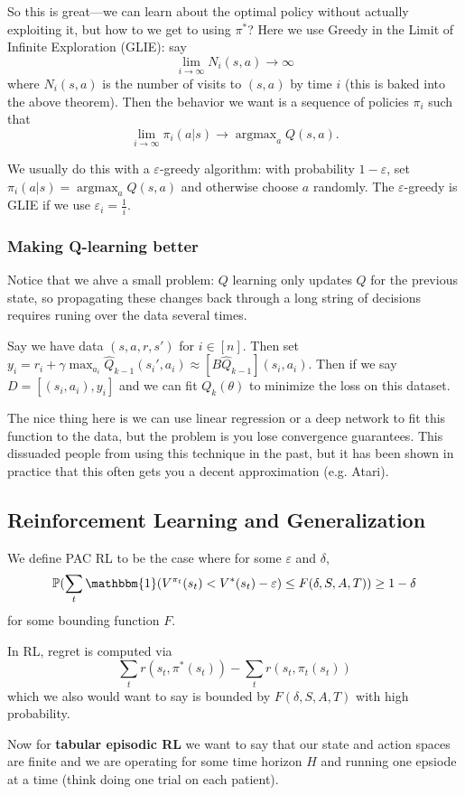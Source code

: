 \documentclass[12pt]{article}
\DeclareMathOperator*{\argmax}{argmax}
\begin{document}
So this is great---we can learn about the optimal policy without actually exploiting it, but how to we get to using $\pi^\ast$? Here we use Greedy in the Limit of Infinite Exploration (GLIE): say
\[\lim_{i\to\infty}N_i(s,a)\to\infty\]
where $N_i(s,a)$ is the number of visits to $(s,a)$ by time $i$ (this is baked into the above theorem). Then the behavior we want is a sequence of policies $\pi_i$ such that
\[\lim_{i\to\infty}\pi_i(a|s)\to\argmax_aQ(s,a).\]

We usually do this with a $\varepsilon$-greedy algorithm: with probability $1-\varepsilon$, set $\pi_i(a|s)=\argmax_aQ(s,a)$ and otherwise choose $a$ randomly. The $\varepsilon$-greedy is GLIE if we use $\varepsilon_i=\frac{1}{i}.$

\subsubsection{Making Q-learning better}
Notice that we ahve a small problem: $Q$ learning only updates $Q$ for the previous state, so propagating these changes back through a long string of decisions requires runing over the data several times.

Say we have data $(s,a,r,s')$ for $i\in[n]$. Then set $y_i=r_i+\gamma\max_{a_i}\hat Q_{k-1}(s_i',a_i)\approx[B\hat Q_{k-1}](s_i,a_i).$
Then if we say $D=[(s_i,a_i),y_i]$ and we can fit $Q_k(\theta)$ to minimize the loss on this dataset.

The nice thing here is we can use linear regression or a deep network to fit this function to the data, but the problem is you lose convergence guarantees. This dissuaded people from using this technique in the past, but it has been shown in practice that this often gets you a decent approximation (e.g. Atari).
\subsection{Reinforcement Learning and Generalization}
We define PAC RL to be the case where for some $\varepsilon$ and $\delta$,
\[\bbP(\sum_t \mathbbm{1}(V^{\pi_t}(s_t)<V^\ast(s_t)-\varepsilon)\le F(\delta, S, A, T))\ge 1-\delta\]
for some bounding function $F$. 

In RL, regret is computed via
\[\sum_t r(s_t,\pi^\ast(s_t))-\sum_tr(s_t,\pi_t(s_t))\]
which we also would want to say is bounded by $F(\delta,S,A,T)$ with high probability.

Now for \textbf{tabular episodic RL} we want to say that our state and action spaces are finite and we are operating for some time horizon $H$ and running one epsiode at a time (think doing one trial on each patient).
\end{document}
